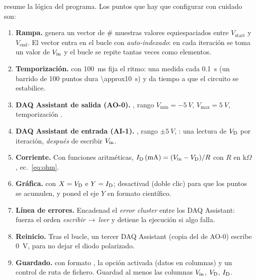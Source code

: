 \documentclass[11pt,a4paper]{article}
\begin{document}
 resume la lógica del programa. Los puntos que hay que
configurar con cuidado son:

\begin{enumerate}
  \item \textbf{Rampa.}  genera un vector de \# muestras
    valores equiespaciados entre $V_{\text{start}}$ y $V_{\text{end}}$. El
    vector entra en el bucle  con \emph{auto-indexado}: en cada
    iteración se toma un valor de $\Vin$ y el bucle se repite tantas veces
    como elementos.
  \item \textbf{Temporización.}  con
    \SI{100}{ms} fija el ritmo: una medida cada \SI{0.1}{s} (un barrido de
    100 puntos dura \SI{\approx10}{s}) y da tiempo a que el circuito se
    estabilice.
  \item \textbf{DAQ Assistant de salida (AO-0).}
    ,
    rango $V_{\min}=\SI{-5}{V}$, $V_{\max}=\SI{5}{V}$, temporización
    .
  \item \textbf{DAQ Assistant de entrada (AI-1).}
    ,
    rango $\pm\SI{5}{V}$, : una lectura de $\VD$ por
    iteración, \emph{después} de escribir $\Vin$.
  \item \textbf{Corriente.} Con funciones aritméticas,
    $\ID\,(\si{mA})=(\Vin-\VD)/R$ con $R$ en k$\Omega$, ec.~\eqref{eq:ohm}.
  \item \textbf{Gráfica.}  con $X=\VD$ e $Y=\ID$;
    desactivad  (doble clic) para que los puntos
    se acumulen, y poned el eje $Y$ en formato científico.
  \item \textbf{Línea de errores.} Encadenad el \emph{error cluster} entre
    los DAQ Assistant: fuerza el orden \emph{escribir}\,$\to$\,\emph{leer} y
    detiene la ejecución si algo falla.
  \item \textbf{Reinicio.} Tras el bucle, un tercer DAQ Assistant (copia del
    de AO-0) escribe \SI{0}{V}, para no dejar el diodo polarizado.
  \item \textbf{Guardado.}  con formato , la opción
     activada (datos en columnas) y un control de ruta de
    fichero. Guardad al menos las columnas $\Vin$, $\VD$, $\ID$.
\end{enumerate}
\end{document}
